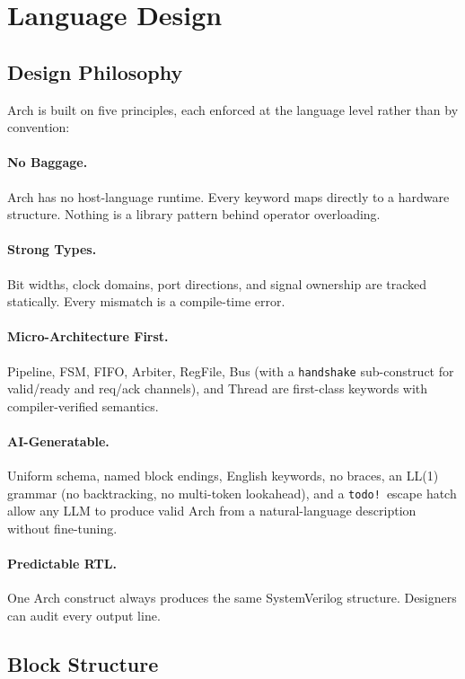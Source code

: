 \documentclass[11pt,twocolumn]{article}
\begin{document}
\section{Language Design}\label{sec:design}

\subsection{Design Philosophy}

Arch is built on five principles, each enforced at the language level rather than by convention:

\paragraph{No Baggage.} Arch has no host-language runtime. Every keyword maps directly to a hardware structure. Nothing is a library pattern behind operator overloading.

\paragraph{Strong Types.} Bit widths, clock domains, port directions, and signal ownership are tracked statically. Every mismatch is a compile-time error.

\paragraph{Micro-Architecture First.} Pipeline, FSM, FIFO, Arbiter, RegFile, Bus (with a \texttt{handshake} sub-construct for valid/ready and req/ack channels), and Thread are first-class keywords with compiler-verified semantics.

\paragraph{AI-Generatable.} Uniform schema, named block endings, English keywords, no braces, an LL(1) grammar (no backtracking, no multi-token lookahead), and a \texttt{todo!}\ escape hatch allow any LLM to produce valid Arch from a natural-language description without fine-tuning.

\paragraph{Predictable RTL.} One Arch construct always produces the same SystemVerilog structure. Designers can audit every output line.

\subsection{Block Structure}
\end{document}
